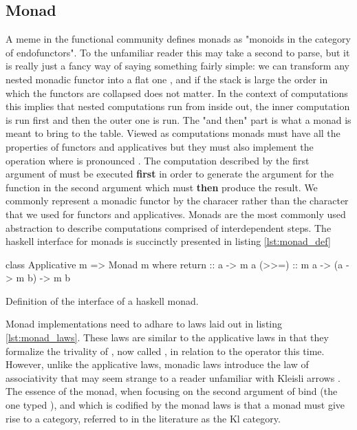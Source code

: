   \subsection{Monad}

  A meme in the functional community defines monads as "monoids in the
  category of endofunctors". To the unfamiliar reader this may take a
  second to parse, but it is really just a fancy way of saying something
  fairly simple: we can transform any nested monadic functor  into a flat one , and if the stack is large  the order in which the functors are collapsed does
  not matter. In the context of computations this implies that nested
  computations run from inside out, the inner computation is run first
  and then the outer one is run. The "and then" part is what a monad is
  meant to bring to the table. Viewed as computations monads must have
  all the properties of functors and applicatives but they must also
  implement the operation  where
  \hask{>>=} is pronounced . The computation described by the
  first argument of \hask{>>=} must be executed \textbf{first} in order
  to generate the argument for the function in the second argument which
  must \textbf{then} produce the result. We commonly represent a monadic
  functor by the characer  rather than the character 
  that we used for functors and applicatives. Monads are the most
  commonly used abstraction to describe computations comprised of
  interdependent steps. The haskell interface for monads is succinctly
  presented in listing \ref{lst:monad_def}

  \begin{code}
\begin{haskellcode}
class Applicative m => Monad m where
  return :: a -> m a
  (>>=) :: m a -> (a -> m b) -> m b
\end{haskellcode}
    \caption{\label{lst:monad_def}Definition of the interface of a
      haskell monad.}
  \end{code}

  Monad implementations need to adhare to laws laid out in listing
  \ref{lst:monad_laws}. These laws are similar to the applicative laws
  in that they formalize the trivality of , now called
  , in relation to the  operator this
  time. However, unlike the applicative laws, monadic laws introduce the
  law of associativity that may seem strange to a reader unfamiliar with
  Kleisli arrows \cite{dawsonCompoundMonadsKleisli2007}. The essence of
  the monad, when focusing on the second argument of bind (the one typed
  ), and which is codified by the monad laws is that a
  monad  must give rise to a category, referred to in the
  literature as the Kl category.

